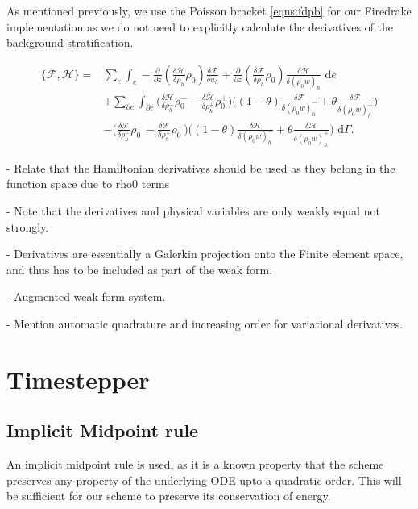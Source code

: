 \documentclass[a4paper,11pt]{article}
\begin{document}
As mentioned previously, we use the Poisson bracket \eqref{eqns:fdpb} for our Firedrake implementation as we do not need to explicitly calculate the derivatives of the background stratification. 

 \begin{equation}
\begin{aligned}
 \{ \mathcal{F},  \mathcal{H}\} = &  \sum_e \int_e - \frac{\partial}{\partial z}(\frac{\delta  \mathcal{H}}{\delta \rho_h}\rho_0 ) \frac{\delta  \mathcal{F}}{\delta u_h} + \frac{\partial}{\partial z}(\frac{\delta  \mathcal{F}}{\delta \rho_h}\rho_0)\frac{\delta  \mathcal{H}}{\delta (\rho_0 w)_h} \text{ d}e \\
 &+ \sum_{\partial e}\int_{\partial e } \bigg(  \frac{\delta  \mathcal{H}}{\delta \rho_h^-}\rho_0^- -\frac{\delta  \mathcal{H}}{\delta \rho_h^+}\rho_0^+\bigg)\bigg ( (1-\theta) \frac{\delta  \mathcal{F}}{\delta  (\rho_0 w)_h^-}+ \theta\frac{\delta  \mathcal{F}}{\delta  (\rho_0 w)_h^+} \bigg)\\
 & - \bigg(  \frac{\delta  \mathcal{F}}{\delta \rho_h^-}\rho_0^- -\frac{\delta  \mathcal{F}}{\delta \rho_h^+}\rho_0^+\bigg)\bigg ( (1-\theta) \frac{\delta  \mathcal{H}}{\delta  (\rho_0 w)_h^-}+ \theta\frac{\delta  \mathcal{H}}{\delta  (\rho_0 w)_h^+} \bigg) \text{ d} \Gamma.
 \end{aligned}
 \end{equation}

 - Relate that the Hamiltonian derivatives should be used as they belong in the function space due to rho0 terms
 
 - Note that the derivatives and physical variables are only weakly equal not strongly.
 
 - Derivatives are essentially a Galerkin projection onto the Finite element space, and thus has to be included as part of the weak form.
 
 - Augmented weak form system.
 
 - Mention automatic quadrature and increasing order for variational derivatives.
 
 
\section{Timestepper}
\subsection{Implicit Midpoint rule}
An implicit midpoint rule is used, as it is a known property that the scheme preserves any property of the underlying ODE upto a quadratic order. This will be sufficient for our scheme to preserve its conservation of energy.
\end{document}
